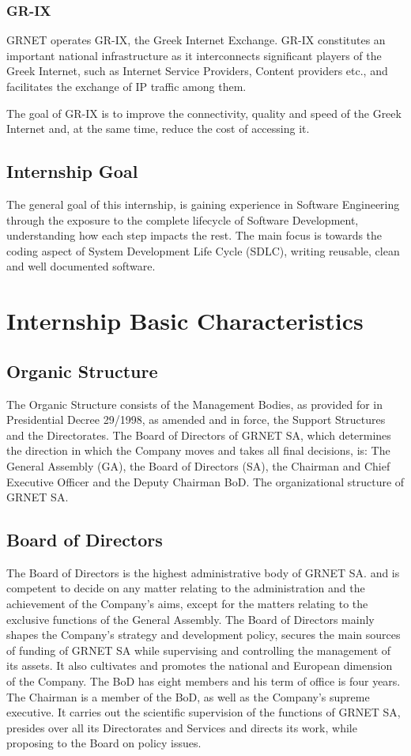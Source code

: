 \subsubsection{GR-IX}
GRNET operates GR-IX, the Greek Internet Exchange.
GR-IX constitutes an important national infrastructure
as it interconnects significant players of the Greek Internet,
such as Internet Service Providers, Content providers etc.,
and facilitates the exchange of IP traffic among them.

The goal of GR-IX is to improve the connectivity,
quality and speed of the Greek Internet and,
at the same time, reduce the cost of accessing it.


\subsection{Internship Goal}
The general goal of this internship, is gaining experience in Software Engineering through the exposure to the complete lifecycle of Software Development, understanding how each step impacts the rest. The main focus is towards the coding aspect of System Development Life Cycle (SDLC), writing reusable, clean and well documented software.

\section{Internship Basic Characteristics}\label{ch:basic_characteristics}

\subsection{Organic Structure}
The Organic Structure consists of the Management Bodies,
as provided for in Presidential Decree 29/1998,
as amended and in force, the Support Structures and the Directorates.
The Board of Directors of GRNET SA,
which determines the direction in which the Company moves and takes all final decisions, is:
The General Assembly (GA), the Board of Directors (SA),
the Chairman and Chief Executive Officer and the Deputy Chairman BoD.
The organizational structure of GRNET SA.

\subsection{Board of Directors}
The Board of Directors is the highest administrative body of GRNET SA.
and is competent to decide on any matter relating to the administration and the achievement of the Company's aims,
except for the matters relating to the exclusive functions of the General Assembly.
The Board of Directors mainly shapes the Company's strategy and development policy,
secures the main sources of funding of GRNET SA while supervising and controlling the management of its assets.
It also cultivates and promotes the national and European dimension of the Company.
The BoD has eight members and his term of office is four years.
The Chairman is a member of the BoD, as well as the Company's supreme executive.
It carries out the scientific supervision of the functions of GRNET SA,
presides over all its Directorates and Services and directs its work, while proposing to the Board on policy issues.

